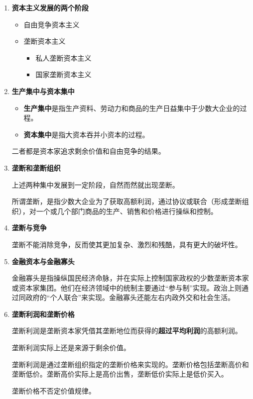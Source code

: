 \documentclass[12pt, a4paper, oneside]{ctexart}
\begin{document}
\begin{enumerate}
  \item {\bf 资本主义发展的两个阶段}

  \begin{itemize}
    \item 自由竞争资本主义
    \item 垄断资本主义
    \begin{itemize}
      \item 私人垄断资本主义
      \item 国家垄断资本主义
    \end{itemize}
  \end{itemize}

  \item {\bf 生产集中与资本集中}
  
  \begin{itemize}
    \item {\bf 生产集中}是指生产资料、劳动力和商品的生产日益集中于少数大企业的过程。
    \item {\bf 资本集中}是指大资本吞并小资本的过程。
  \end{itemize}

  二者都是资本家追求剩余价值和自由竞争的结果。

  \item {\bf 垄断和垄断组织}
  
  上述两种集中发展到一定阶段，自然而然就出现垄断。

  所谓垄断，是指少数大企业为了获取高额利润，通过协议或联合（形成垄断组织），对一个或几个部门商品的生产、销售和价格进行操纵和控制。

  \item {\bf 垄断与竞争}
  
  垄断不能消除竞争，反而使其更加复杂、激烈和残酷，具有更大的破坏性。

  \item {\bf 金融资本与金融寡头}
  
  金融寡头是指操纵国民经济命脉，并在实际上控制国家政权的少数垄断资本家或资本家集团。他们在经济领域中的统制主要通过“参与制”实现。政治上则通过同政府的“个人联合”来实现。金融寡头还能左右内政外交和社会生活。

  \item {\bf 垄断利润和垄断价格}
  
  垄断利润是垄断资本家凭借其垄断地位而获得的\textbf{超过平均利润}的高额利润。

  垄断利润实际上还是来源于剩余价值。

  垄断利润是通过垄断组织指定的垄断价格来实现的。垄断价格包括垄断高价和垄断低价。垄断高价实际上是高价出售，垄断低价实际上是低价买入。

  垄断价格不否定价值规律。

\end{enumerate}
\end{document}
